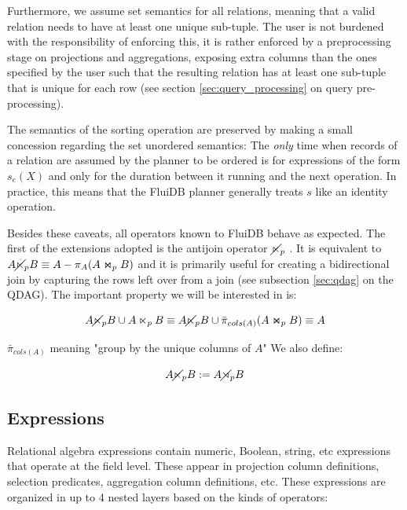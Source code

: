 Furthermore, we assume set semantics for all relations, meaning that a
valid relation needs to have at least one unique sub-tuple. The user
is not burdened with the responsibility of enforcing this, it is
rather enforced by a preprocessing stage on projections and
aggregations, exposing extra columns than the ones specified by the
user such that the resulting relation has at least one sub-tuple that
is unique for each row (see section \ref{sec:query_processing} on
query pre-processing).

The semantics of the sorting operation are preserved by making a small
concession regarding the set unordered semantics: The \emph{only} time when records of
a relation are assumed by the planner to be ordered is for expressions
of the form \(s_e(X)\) and only for the duration between it running
and the next operation. In practice, this means that the FluiDB
planner generally treats \(s\) like an identity operation.

Besides these caveats, all operators known to FluiDB behave as expected.
The first of the extensions adopted is the antijoin operator
\(\cancel\ltimes_p\) . It is equivalent to
\(A \cancel\ltimes_p B \equiv A - \pi_A(A \Join_p B)\) and it is
primarily useful for creating a bidirectional join by capturing the
rows left over from a join (see subsection \ref{sec:qdag} on the
QDAG). The important property we will be interested in is:

\[
  A \cancel\ltimes_p B \cup A \ltimes_p B \equiv A \cancel\ltimes_p B \cup \bar\pi_{cols(A)}(A \Join_p B) \equiv A
\]

\(\bar{\pi}_{cols(A)}\) meaning "group by the unique columns of \(A\)"
We also define:

\[
  A \cancel\ltimes_p B := A \cancel\rtimes_p B
\]

\subsection{Expressions}
\label{sec:expressions_predicates}

Relational algebra expressions contain numeric, Boolean, string, etc expressions that operate at the
field level. These appear in projection column definitions, selection
predicates, aggregation column definitions, etc. These expressions are
organized in up to 4 nested layers based on the kinds of operators:

